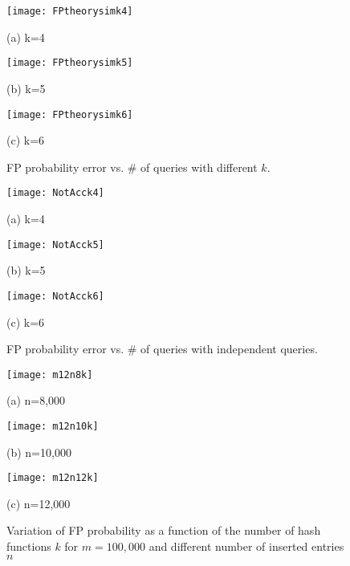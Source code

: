  \begin{figure*}[htbp]
 	\begin{minipage}{0.28\linewidth}
 		\centerline{\texttt{[image: FPtheorysimk4]}}
 		\centerline{(a) k=4}
 	\end{minipage}
 	\hfill
 	\begin{minipage}{0.28\linewidth}
 		\centerline{\texttt{[image: FPtheorysimk5]}}
 		\centerline{(b) k=5}
 	\end{minipage}
 	\hfill
 	\begin{minipage}{0.28\linewidth}
 		\centerline{\texttt{[image: FPtheorysimk6]}}
 		\centerline{(c) k=6}
 	\end{minipage}
 	\caption{FP probability error vs. \# of queries with different $k$.}  \vspace{-0.07in}
 	\label{fig:error:abso}
 \end{figure*}
 
  \begin{figure*}[htbp]
  	\begin{minipage}{0.28\linewidth}
  		\centerline{\texttt{[image: NotAcck4]}}
  		\centerline{(a) k=4}
  	\end{minipage}
  	\hfill
  	\begin{minipage}{0.28\linewidth}
  		\centerline{\texttt{[image: NotAcck5]}}
  		\centerline{(b) k=5}
  	\end{minipage}
  	\hfill
  	\begin{minipage}{0.28\linewidth}
  		\centerline{\texttt{[image: NotAcck6]}}
  		\centerline{(c) k=6}
  	\end{minipage}
  	\caption{FP probability error vs. \# of queries with independent queries.} \vspace{-0.07in}
  	\label{fig:error:notAcc}
  \end{figure*}
 
  
  \begin{figure*}[htbp]
  	\begin{minipage}{0.28\linewidth}
  		\centerline{\texttt{[image: m12n8k]}}
  		\centerline{(a) n=8,000}
  	\end{minipage}
  	\hfill
  	\begin{minipage}{0.28\linewidth}
  		\centerline{\texttt{[image: m12n10k]}}
  		\centerline{(b) n=10,000}
  	\end{minipage}
  	\hfill
  	\begin{minipage}{0.28\linewidth}
  		\centerline{\texttt{[image: m12n12k]}}
  		\centerline{(c) n=12,000}
  	\end{minipage}
  	\caption{Variation of FP probability as a function of the number of hash functions $k$ for $m=100,000$ and different number of inserted entries $n$} \vspace{0in}
  	\label{fig:bestk}
  \end{figure*}
  
